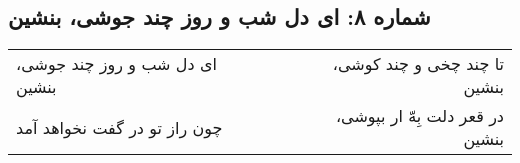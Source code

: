 \begin{center}
\section*{شماره ۸: ای دل شب و روز چند جوشی، بنشین}
\label{sec:008}
\begin{longtable}{l p{0.5cm} r}
ای دل شب و روز چند جوشی، بنشین
&&
تا چند چخی و چند کوشی، بنشین
\\
چون راز تو در گفت نخواهد آمد
&&
در قعر دلت بِهّ ار بپوشی، بنشین
\\
\end{longtable}
\end{center}
